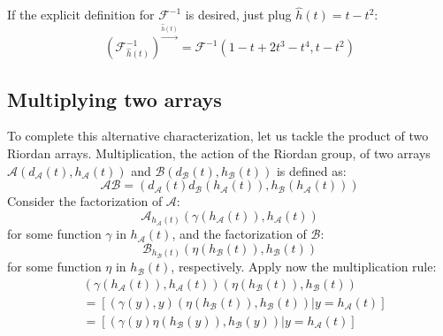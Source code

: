 If the explicit definition for $\mathcal{F}^{-1}$ is desired, just plug $\hat{h}(t)=t-t^2$:
\begin{displaymath}
    \left(\mathcal{F}_{\hat{h}(t)}^{-1}\right)^{\stackrel{\hat{h}(t)}{\rightarrow}} =
        \mathcal{F}^{-1}\left(1-t+2t^3-t^4,t-t^2\right)
\end{displaymath}

\subsection{Multiplying two arrays}

To complete this alternative characterization, let us tackle the product of
two Riordan arrays. Multiplication, the action of the Riordan group, of two arrays
$\mathcal{A}(d_{\mathcal{A}}(t), h_{\mathcal{A}}(t))$ and 
$\mathcal{B}(d_{\mathcal{B}}(t), h_{\mathcal{B}}(t))$ is defined as:
\begin{displaymath}
    \mathcal{A}\mathcal{B} = \left(d_{\mathcal{A}}(t)d_{\mathcal{B}}(h_{\mathcal{A}}(t)),
        h_{\mathcal{B}}(h_{\mathcal{A}}(t))\right)
\end{displaymath}
Consider the factorization of $\mathcal{A}$:
\begin{displaymath}
    \mathcal{A}_{h_\mathcal{A}(t)} \left(\gamma(h_{\mathcal{A}}(t)), h_{\mathcal{A}}(t)  \right)
\end{displaymath}
for some function $\gamma $ in $h_{\mathcal{A}}(t)$, and the factorization of $\mathcal{B}$:
\begin{displaymath}
    \mathcal{B}_{h_\mathcal{B}(t)} \left(\eta(h_{\mathcal{B}}(t)), h_{\mathcal{B}}(t)  \right)
\end{displaymath}
for some function $\eta $ in $h_{\mathcal{B}}(t)$, respectively. Apply now the multiplication rule:
\begin{displaymath}
    \begin{split}
        & \left(\gamma(h_{\mathcal{A}}(t)), h_{\mathcal{A}}(t)  \right)
            \left(\eta(h_{\mathcal{B}}(t)), h_{\mathcal{B}}(t)  \right) \\
        &=\left[\left.\left(\gamma(y), y  \right)
            \left(\eta(h_{\mathcal{B}}(t)), h_{\mathcal{B}}(t)  \right) \right| y=h_{\mathcal{A}}(t) \right]\\
        &=\left[\left.\left(\gamma(y)\eta(h_{\mathcal{B}}(y)), h_{\mathcal{B}}(y)  \right) \right|
             y=h_{\mathcal{A}}(t) \right]\\
    \end{split}
\end{displaymath}
